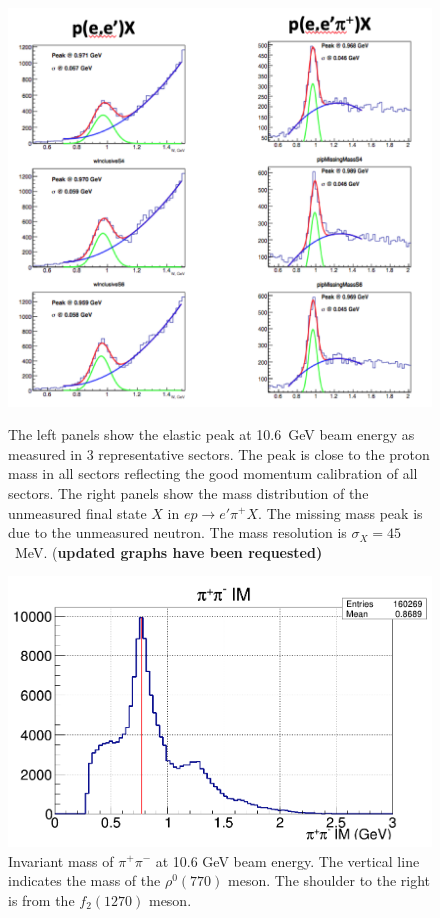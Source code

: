 \documentclass[final,3p,twocolumn]{elsarticle}
\begin{document}
\begin{figure}[t!]
\centerline{\includegraphics[width=1.0\columnwidth]{elastic_pi+n.png}}
\caption{The left panels show the elastic peak at 10.6~GeV beam energy as measured in 3 representative sectors.
  The peak is close to the proton mass in all sectors reflecting the good momentum calibration of all sectors. The right
  panels show the mass distribution of the unmeasured final state $X$ in $ep \to e'\pi^+ X$. The missing mass peak
  is due to the unmeasured neutron. The mass resolution is $\sigma_X = 45$~MeV. {(\bf updated graphs have been requested)} }
\label{elastic-peak}

\vspace{0.3cm}\centerline{\includegraphics[width=1.0\columnwidth]{rhoMass.png}}
\caption{Invariant mass of $\pi^+\pi^-$ at 10.6 GeV beam energy. The vertical line indicates the mass of the
  $\rho^0(770)$ meson. The shoulder to the right is from the $f_2(1270)$ meson.}
\label{pip-pim-p}
\end{figure} 
\end{document}
